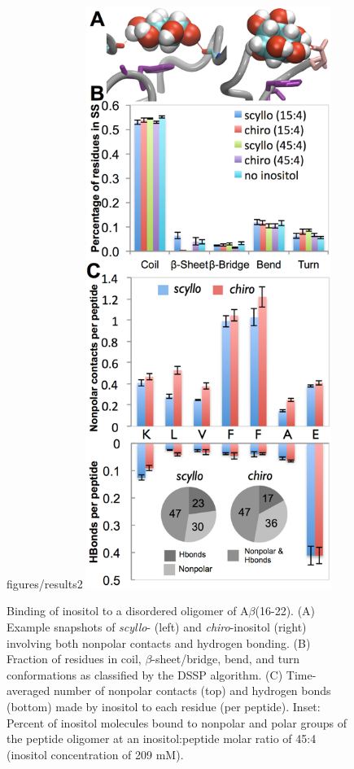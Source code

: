 \begin{figure}figures/results2
\includegraphics[width=7.96cm]{figures/results2/inos2_figures_disordered_revised.pdf}
\caption[Binding of inositol to a disordered oligomer of A$\beta$(16-22)]{Binding of inositol to a disordered oligomer of A$\beta$(16-22).  (A) Example snapshots of \emph{scyllo}- (left) and \emph{chiro}-inositol (right) involving both nonpolar contacts and hydrogen bonding. (B) Fraction of residues in coil, $\beta$-sheet/bridge, bend, and turn conformations as classified by the DSSP algorithm. (C) Time-averaged number of nonpolar contacts (top) and hydrogen bonds (bottom) made by inositol to each residue (per peptide). Inset: Percent of inositol molecules bound to nonpolar and polar groups of the peptide oligomer at an inositol:peptide molar ratio of 45:4 (inositol concentration of 209 mM).}
\label{fig:disordered}
\end{figure}

